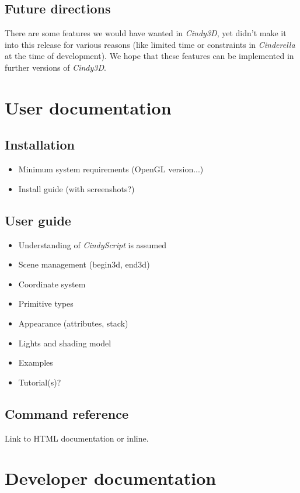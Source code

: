 \documentclass{scrartcl}
\begin{document}
\subsection{Future directions}

There are some features we would have wanted in \emph{Cindy3D}, yet didn't make it into this release for various reasons (like limited time or constraints in \emph{Cinderella} at the time of development). We hope that these features can be implemented in further versions of \emph{Cindy3D}.

\section{User documentation}

\subsection{Installation}

\begin{itemize}
\item Minimum system requirements (OpenGL version...)
\item Install guide (with screenshots?)
\end{itemize}

\subsection{User guide}

\begin{itemize}
\item Understanding of \emph{CindyScript} is assumed
\item Scene management (begin3d, end3d)
\item Coordinate system
\item Primitive types
\item Appearance (attributes, stack)
\item Lights and shading model
\item Examples
\item Tutorial(s)?
\end{itemize}

\subsection{Command reference}

Link to HTML documentation or inline.

\section{Developer documentation}
\end{document}
